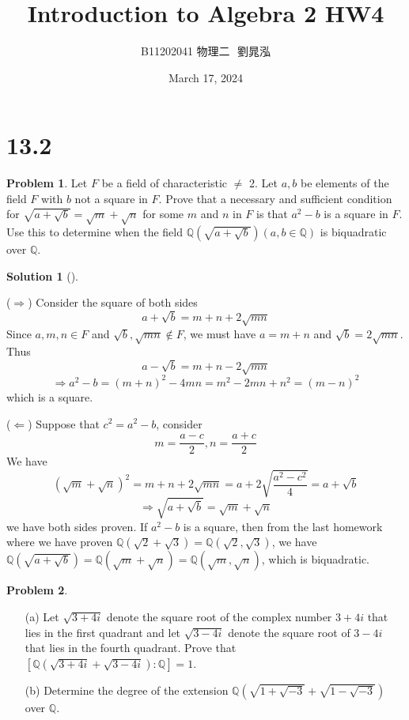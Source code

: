 \documentclass{article}
\title{Introduction to Algebra 2 HW4}
\author{B11202041 物理二 $ $ 劉晁泓}
\date{March 17, 2024}
\theoremstyle{definition}
\newtheorem{prob}{Problem}
\newtheorem*{sol}{Solution}
\newenvironment{sols}[1][]{%
  \begin{sol}[#1]$ $\par\nobreak\ignorespaces
}{%
  \end{sol}
}
\begin{document}
\maketitle
\thispagestyle{fancy}
\renewcommand{\footrulewidth}{0.4pt}
\cfoot{\thepage}
\renewcommand{\headrulewidth}{0.4pt}

\section*{13.2}

\setcounter{prob}{8}
\begin{prob}
	Let $F$ be a field of characteristic $\neq$ 2.
	Let $a, b$ be elements of the field $F$ with $b$ not a square in $F$.
	Prove that a necessary and sufficient condition for $\sqrt{a + \sqrt{b}} = \sqrt{m} + \sqrt{n}$ for some $m$ and $n$ in $F$ is that $a^2 - b$ is a square in $F$.
	Use this to determine when the field $\mathbb{Q}(\sqrt{a + \sqrt{b}})(a, b \in \mathbb{Q})$ is biquadratic over $\mathbb{Q}$.
\end{prob}

\begin{sols}
	($\Rightarrow$) Consider the square of both sides
	\[
		a + \sqrt{b} = m + n + 2 \sqrt{mn}
	\]
	Since $a, m, n \in F$ and $\sqrt{b}, \sqrt{mn} \notin F$, we must have $a = m + n$ and $\sqrt{b} = 2 \sqrt{mn}$.
	Thus
	\[
		a - \sqrt{b} = m + n - 2 \sqrt{mn}
	\]
	\[
		\Rightarrow a^2 - b = (m + n)^2 - 4mn = m^2 - 2mn + n^2 = (m - n)^2
	\]
	which is a square.
	\par ($\Leftarrow$) Suppose that $c^2 = a^2 - b$, consider 
	\[
		m = \frac{a - c}{2}, n = \frac{a + c}{2}
	\]
	We have
	\[
		(\sqrt{m} + \sqrt{n})^2 = m + n + 2 \sqrt{mn} = a + 2 \sqrt{\frac{a^2 - c^2}{4}} = a + \sqrt{b}
	\]
	\[
		\Rightarrow \sqrt{a + \sqrt{b}} = \sqrt{m} + \sqrt{n}
	\]
	we have both sides proven.
	If $a^2 - b$ is a square, then from the last homework where we have proven $\mathbb{Q}(\sqrt{2} + \sqrt{3}) = \mathbb{Q}(\sqrt{2}, \sqrt{3})$, we have $\mathbb{Q}(\sqrt{a + \sqrt{b}}) = \mathbb{Q}(\sqrt{m} + \sqrt{n}) = \mathbb{Q}(\sqrt{m}, \sqrt{n})$, which is biquadratic. 
\end{sols}

\setcounter{prob}{10}
\begin{prob}
	$ $\par\nobreak\ignorespaces
	\begin{enumerate}
		\item[(a)] Let $\sqrt{3 + 4i}$ denote the square root of the complex number $3 + 4i$ that lies in the first quadrant and let $\sqrt{3 - 4i}$ denote the square root of $3 - 4i$ that lies in the fourth quadrant.
			Prove that $[\mathbb{Q}(\sqrt{3 + 4i} + \sqrt{3 - 4i}) : \mathbb{Q}] = 1$.

		\item[(b)] Determine the degree of the extension $\mathbb{Q}(\sqrt{1 + \sqrt{-3}} + \sqrt{1 - \sqrt{-3}})$ over $\mathbb{Q}$.
	\end{enumerate}
\end{prob}
\end{document}
